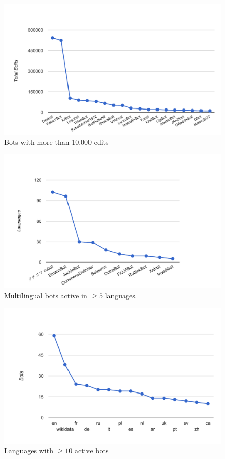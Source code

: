 \documentclass{sig-alternate}
\begin{document}
\begin{figure}[p]
  \center
  \includegraphics[width=\linewidth]{most-active-bots.pdf}
  \caption{Bots with more than 10,000 edits}
  \label{fig:most-active-bots}
\end{figure}

\begin{figure}[p]
  \center
  \includegraphics[width=\linewidth]{multilingual-bots.pdf}
  \caption{Multilingual bots active in $\geq5$ languages}
  \label{fig:multilingual-bots}
\end{figure}

\begin{figure}[p]
  \center
  \includegraphics[width=\linewidth]{bots-per-language.pdf}
  \caption{Languages with $\geq10$ active bots}
  \label{fig:bots-per-language}
\end{figure}
\end{document}
